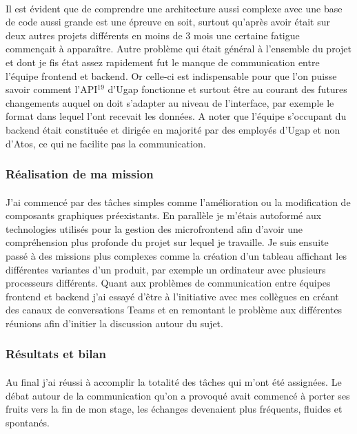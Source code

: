 \documentclass[12pt]{article}
\begin{document}
\begin {sloppypar}
\paragraph{}
Il est évident que de comprendre une architecture aussi complexe avec une base de code aussi grande 
est une épreuve en soit, surtout qu'après avoir était sur deux autres projets différents en moins de 3 mois
une certaine fatigue commençait à apparaître. Autre problème qui était général à l'ensemble du projet
et dont je fis état assez rapidement fut le manque de communication entre l'équipe frontend et backend. 
Or celle-ci est indispensable pour que l'on puisse savoir comment l'API$^{19}$ d'Ugap fonctionne et
surtout être au courant des futures changements auquel on doit s'adapter au niveau de l'interface,
par exemple le format dans lequel l'ont recevait les données. A noter que l'équipe s'occupant du 
backend était constituée et dirigée en majorité par des employés d'Ugap et non d'Atos, ce qui ne 
facilite pas la communication.
\subsubsection{Réalisation de ma mission}
\paragraph{}
J'ai commencé par des tâches simples comme l'amélioration ou la modification de composants graphiques
préexistants. En parallèle je m'étais autoformé aux technologies utilisés pour la gestion des microfrontend 
afin d'avoir une compréhension plus profonde du projet sur lequel je travaille. Je suis ensuite passé à des missions 
plus complexes comme la création d'un tableau affichant les différentes variantes d'un produit, par exemple
un ordinateur avec plusieurs processeurs différents. Quant aux problèmes de communication entre équipes frontend 
et backend j'ai essayé d'être à l'initiative avec mes collègues en créant des canaux de conversations Teams 
et en remontant le problème aux différentes réunions afin d'initier la discussion autour du sujet.

\subsubsection{Résultats et bilan}
\paragraph{}
Au final j'ai réussi à accomplir la totalité des tâches qui m'ont été assignées. Le débat autour de la communication 
qu'on a provoqué avait commencé à porter ses fruits vers la fin de mon stage, les échanges devenaient plus 
fréquents, fluides et spontanés. 

\end{sloppypar}
\end{document}
